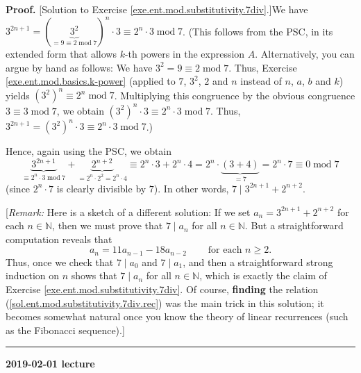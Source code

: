 \documentclass[numbers=enddot,12pt,final,onecolumn,notitlepage]{scrartcl}%
\numberwithin{exer}{subsection}
\theoremstyle{definition}
\newenvironment{fineprint}{\begin{small}}{\end{small}}
\newenvironment{proof}[1][Proof]{\noindent\textbf{#1.} }{\ \rule{0.5em}{0.5em}}
\begin{document}
\begin{fineprint}
\begin{proof}
[Solution to Exercise \ref{exe.ent.mod.substitutivity.7div}.]We have
$3^{2n+1}=\left(  \underbrace{3^{2}}_{=9\equiv2\operatorname{mod}7}\right)
^{n}\cdot3\equiv2^{n}\cdot3\operatorname{mod}7$. (This follows from the PSC,
in its extended form that allows $k$-th powers in the expression $A$.
Alternatively, you can argue by hand as follows: We have $3^{2}=9\equiv
2\operatorname{mod}7$. Thus, Exercise \ref{exe.ent.mod.basics.k-power}
(applied to $7$, $3^{2}$, $2$ and $n$ instead of $n$, $a$, $b$ and $k$) yields
$\left(  3^{2}\right)  ^{n}\equiv2^{n}\operatorname{mod}7$. Multiplying this
congruence by the obvious congruence $3\equiv3\operatorname{mod}7$, we obtain
$\left(  3^{2}\right)  ^{n}\cdot3\equiv2^{n}\cdot3\operatorname{mod}7$. Thus,
$3^{2n+1}=\left(  3^{2}\right)  ^{n}\cdot3\equiv2^{n}\cdot3\operatorname{mod}%
7$.)

Hence, again using the PSC, we obtain%
\[
\underbrace{3^{2n+1}}_{\equiv2^{n}\cdot3\operatorname{mod}7}%
+\underbrace{2^{n+2}}_{=2^{n}\cdot2^{2}=2^{n}\cdot4}\equiv2^{n}\cdot
3+2^{n}\cdot4=2^{n}\cdot\underbrace{\left(  3+4\right)  }_{=7}=2^{n}%
\cdot7\equiv0\operatorname{mod}7
\]
(since $2^{n}\cdot7$ is clearly divisible by $7$). In other words,
$7\mid3^{2n+1}+2^{n+2}$.

[\textit{Remark:} Here is a sketch of a different solution: If we set
$a_{n}=3^{2n+1}+2^{n+2}$ for each $n\in\mathbb{N}$, then we must prove that
$7\mid a_{n}$ for all $n\in\mathbb{N}$. But a straightforward computation
reveals that%
\begin{equation}
a_{n}=11a_{n-1}-18a_{n-2}\ \ \ \ \ \ \ \ \ \ \text{for each }n\geq2.
\label{sol.ent.mod.substitutivity.7div.rec}%
\end{equation}
Thus, once we check that $7\mid a_{0}$ and $7\mid a_{1}$, and then a
straightforward strong induction on $n$ shows that $7\mid a_{n}$ for all
$n\in\mathbb{N}$, which is exactly the claim of Exercise
\ref{exe.ent.mod.substitutivity.7div}. Of course, \textbf{finding} the
relation (\ref{sol.ent.mod.substitutivity.7div.rec}) was the main trick in
this solution; it becomes somewhat natural once you know the theory of linear
recurrences (such as the Fibonacci sequence).]
\end{proof}
\end{fineprint}

\begin{center}
\textbf{2019-02-01 lecture}
\end{center}
\end{document}
